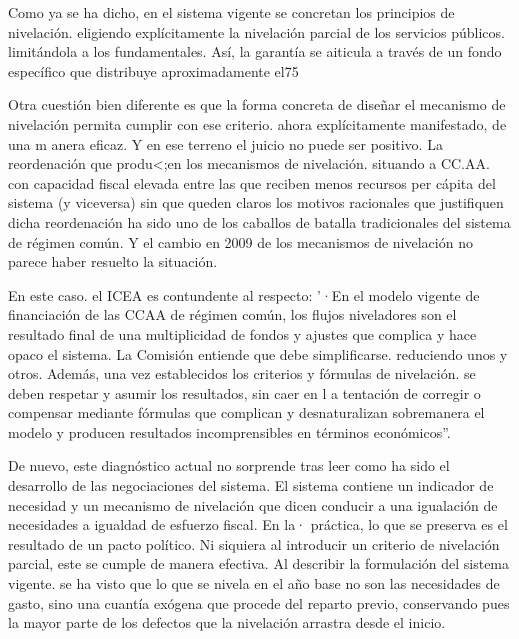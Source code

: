 \documentclass[10pt,a4paper]{article}
\begin{document}
Como ya se ha dicho, en el sistema vigente se concretan los principios de nivelación. eligiendo explícitamente la nivelación parcial de los servicios públicos. limitándola a los fundamentales. Así, la garantía se aiticula a través de un fondo específico que distribuye aproximadamente el75%

Otra cuestión bien diferente es que la forma concreta de diseñar el mecanismo de nivelación permita cumplir con ese criterio. ahora explícitamente manifestado, de una m anera eficaz. Y en ese terreno el juicio no puede ser positivo. La reordenación que produ<;en los mecanismos de nivelación. situando a CC.AA. con capacidad fiscal elevada entre las que reciben menos recursos per cápita del sistema (y viceversa) sin que queden claros los motivos racionales que justifiquen dicha reordenación ha sido uno de los caballos de batalla tradicionales del sistema de régimen común. Y el cambio en 2009 de los mecanismos de nivelación no parece haber resuelto la situación.

En este caso. el ICEA es contundente al respecto: '·En el modelo vigente de financiación de las CCAA de régimen común, los flujos niveladores son el resultado final de una multiplicidad de fondos y ajustes que complica y hace opaco el sistema. La Comisión entiende que debe simplificarse. reduciendo unos y otros. Además, una vez establecidos los criterios y fórmulas de nivelación. se deben respetar y asumir los resultados, sin caer en l a tentación de corregir o compensar mediante fórmulas que complican y desnaturalizan sobremanera el modelo y producen resultados incomprensibles en términos económicos''.

De nuevo, este diagnóstico actual no sorprende tras leer como ha sido el desarrollo de las negociaciones del sistema. El sistema contiene un indicador de necesidad y un mecanismo de nivelación que dicen conducir a una igualación de necesidades a igualdad de esfuerzo fiscal. En la· práctica, lo que se preserva es el resultado de un pacto político. Ni siquiera al introducir un criterio de nivelación parcial, este se cumple de manera efectiva. Al describir la formulación del sistema vigente. se ha visto que lo que se nivela en el año base no son las necesidades de gasto, sino una cuantía exógena que procede del reparto previo, conservando pues la mayor parte de los defectos que la nivelación arrastra desde el inicio.
\end{document}
